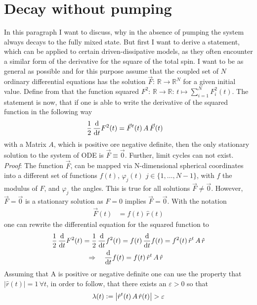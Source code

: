     \section{Decay without pumping}
    \label{appendix:msq_calc}
    In this paragraph I want to discuss, why in the absence of pumping the system always decays to the fully mixed state. But first I want to derive a statement, which can be applied to certain driven-dissipative models, as they often encounter a similar form of the derivative for the square of the total spin. I want to be as general as possible and for this purpose assume that the coupled set of $N$ ordinary differential equations has the solution $\vec{F}:\,\mathbb{R}\rightarrow\mathbb{R}^N$ for a given initial value. Define from that the function squared $F^2:\,\mathbb{R}\rightarrow\mathbb{R}:\,t\mapsto\sum_{i=1}^NF_i^2(t)$. The statement is now, that if one is able to write the derivative of the squared function in the following way
    \begin{align*}
        \frac{1}{2}\,\frac{\text{d}}{\text{d}t} F^2(t)&=\vec{F}^t(t)\,A\,\vec{F}(t)
    \end{align*}
    with a Matrix $A$, which is positive ore negative definite, then the only stationary solution to the system of ODE is $\vec{F}\equiv\vec{0}$. Further, limit cycles can not exist. \\
    \textit{Proof}: The function $\vec{F}$, can be mapped via N-dimensional spherical coordinates into a different set of functions $f(t)$, $\varphi_j(t)$ $j\in\{1,\dots,N-1\}$, with $f$ the modulus of $F$, and $\varphi_j$ the angles. This is true for all solutions $\vec{F}\neq\vec{0}$. However, $\vec{F}=\vec{0}$ is a stationary solution as $F=0$ implies $\vec{F}=\vec{0}$. With the notation
    \begin{align*}
        \vec{F}(t)&=f(t)\,\hat{r}(t)
    \end{align*}
    one can rewrite the differential equation for the squared function to
    \begin{align*}
        \frac{1}{2}\,\frac{\text{d}}{\text{d}t} F^2(t)=\frac{1}{2}\,\frac{\text{d}}{\text{d}t} f^2(t)=f(t)\,\frac{\text{d}}{\text{d}t} f(t)&=f^2(t)\,\hat{r}^t\,A\,\hat{r}\\
        \Rightarrow\quad\frac{\text{d}}{\text{d}t} f(t) = f(t)\,\hat{r}^t\,A\,\hat{r}
    \end{align*}
    Assuming that A is positive or negative definite one can use the property that $|\hat{r}(t)|=1\,\forall t$, in order to follow, that there exists an $\varepsilon>0$ so that
    \begin{align*}
        \lambda(t)\vcentcolon=\left| \hat{r}^t(t)\,A\,\hat{r}(t) \right| > \varepsilon
    \end{align*}
